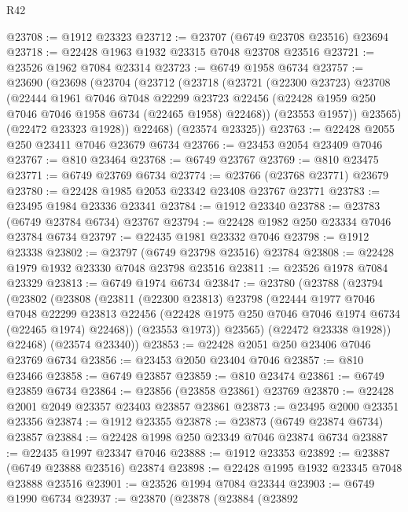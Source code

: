 \begin{lexlean}{R42}
\begin{coremodule}
{@23708 := @1912 @23323
@23712 := @23707 (@6749 @23708 @23516) @23694
@23718 := @22428 @1963 @1932 @23315 @7048 @23708 @23516
@23721 := @23526 @1962 @7084 @23314
@23723 := @6749 @1958 @6734
@23757 := @23690
    (@23698
      (@23704
        (@23712
          (@23718
            (@23721
              (@22300 @23723)
              @23708
              (@22444
                @1961
                @7046
                @7048
                @22299
                @23723
                @22456
                (@22428 @1959 @250 @7046 @7046 @1958 @6734 (@22465 @1958) @22468))
              (@23553 @1957))
            @23565)
          (@22472 @23323 @1928))
        @22468)
      (@23574 @23325))
@23763 := @22428 @2055 @250 @23411 @7046 @23679 @6734
@23766 := @23453 @2054 @23409 @7046
@23767 := @810 @23464
@23768 := @6749 @23767
@23769 := @810 @23475
@23771 := @6749 @23769 @6734
@23774 := @23766 (@23768 @23771) @23679
@23780 := @22428 @1985 @2053 @23342 @23408 @23767 @23771
@23783 := @23495 @1984 @23336 @23341
@23784 := @1912 @23340
@23788 := @23783 (@6749 @23784 @6734) @23767
@23794 := @22428 @1982 @250 @23334 @7046 @23784 @6734
@23797 := @22435 @1981 @23332 @7046
@23798 := @1912 @23338
@23802 := @23797 (@6749 @23798 @23516) @23784
@23808 := @22428 @1979 @1932 @23330 @7048 @23798 @23516
@23811 := @23526 @1978 @7084 @23329
@23813 := @6749 @1974 @6734
@23847 := @23780
    (@23788
      (@23794
        (@23802
          (@23808
            (@23811
              (@22300 @23813)
              @23798
              (@22444
                @1977
                @7046
                @7048
                @22299
                @23813
                @22456
                (@22428 @1975 @250 @7046 @7046 @1974 @6734 (@22465 @1974) @22468))
              (@23553 @1973))
            @23565)
          (@22472 @23338 @1928))
        @22468)
      (@23574 @23340))
@23853 := @22428 @2051 @250 @23406 @7046 @23769 @6734
@23856 := @23453 @2050 @23404 @7046
@23857 := @810 @23466
@23858 := @6749 @23857
@23859 := @810 @23474
@23861 := @6749 @23859 @6734
@23864 := @23856 (@23858 @23861) @23769
@23870 := @22428 @2001 @2049 @23357 @23403 @23857 @23861
@23873 := @23495 @2000 @23351 @23356
@23874 := @1912 @23355
@23878 := @23873 (@6749 @23874 @6734) @23857
@23884 := @22428 @1998 @250 @23349 @7046 @23874 @6734
@23887 := @22435 @1997 @23347 @7046
@23888 := @1912 @23353
@23892 := @23887 (@6749 @23888 @23516) @23874
@23898 := @22428 @1995 @1932 @23345 @7048 @23888 @23516
@23901 := @23526 @1994 @7084 @23344
@23903 := @6749 @1990 @6734
@23937 := @23870
    (@23878
      (@23884
        (@23892
}
\end{coremodule}
\end{lexlean}
